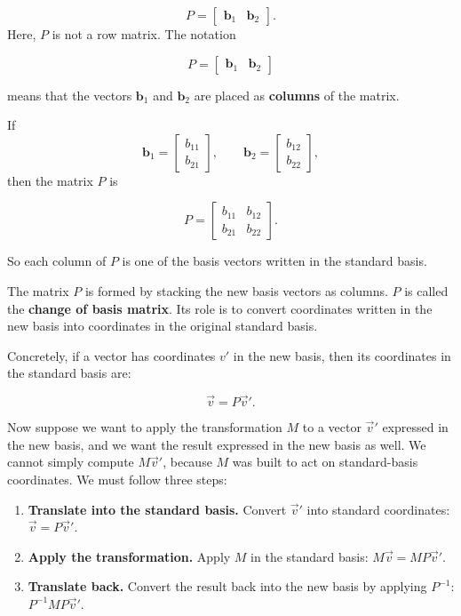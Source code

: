 \documentclass[11pt,openany]{book}
\theoremstyle{definition}
\begin{document}
\[
P = \begin{bmatrix} \mathbf{b}_1 & \mathbf{b}_2 \end{bmatrix}.
\]
Here, $P$ is not a row matrix. The notation

\[
P = \begin{bmatrix} \mathbf{b}_1 & \mathbf{b}_2 \end{bmatrix}
\]

means that the vectors $\mathbf{b}_1$ and $\mathbf{b}_2$ are placed as \textbf{columns} of the matrix.

\medskip

If
\[
\mathbf{b}_1 = \begin{bmatrix} b_{11} \\ b_{21} \end{bmatrix},
\qquad
\mathbf{b}_2 = \begin{bmatrix} b_{12} \\ b_{22} \end{bmatrix},
\]
then the matrix $P$ is

\[
P =
\begin{bmatrix}
b_{11} & b_{12} \\
b_{21} & b_{22}
\end{bmatrix}.
\]

\medskip

So each column of $P$ is one of the basis vectors written in the standard basis.

\medskip

\begin{keyidea} The matrix $P$ is formed by stacking the new basis vectors as columns.
$P$ is called the \textbf{change of basis matrix}. Its role is to convert coordinates
written in the new basis into coordinates in the original standard basis.
\end{keyidea}
Concretely,
if a vector has coordinates $v'$ in the new basis, then its coordinates in the
standard basis are:

\[
\vec{v} = P\vec{v}'.
\]

Now suppose we want to apply the transformation $M$ to a vector $\vec{v}'$ expressed
in the new basis, and we want the result expressed in the new basis as well.
We cannot simply compute $M\vec{v}'$, because $M$ was built to act on standard-basis
coordinates. We must follow three steps:

\begin{enumerate}
  \item \textbf{Translate into the standard basis.} Convert $\vec{v}'$ into standard
  coordinates: $\vec{v} = P\vec{v}'$.
  \item \textbf{Apply the transformation.} Apply $M$ in the standard basis:
  $M\vec{v} = MP\vec{v}'$.
  \item \textbf{Translate back.} Convert the result back into the new basis by
  applying $P^{-1}$: $P^{-1}MP\vec{v}'$.
\end{enumerate}
\end{document}
